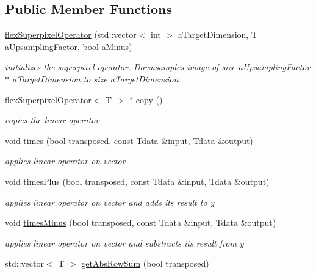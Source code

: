 \subsection*{Public Member Functions}
\begin{DoxyCompactItemize}
\item 
\hyperlink{classflex_superpixel_operator_a810ff259aed4c17eed5b6c731bb59b3b}{flex\+Superpixel\+Operator} (std\+::vector$<$ int $>$ a\+Target\+Dimension, T a\+Upsampling\+Factor, bool a\+Minus)
\begin{DoxyCompactList}\small\item\em initializes the superpixel operator. Downsamples image of size a\+Upsampling\+Factor $\ast$ a\+Target\+Dimension to size a\+Target\+Dimension \end{DoxyCompactList}\item 
\hyperlink{classflex_superpixel_operator}{flex\+Superpixel\+Operator}$<$ T $>$ $\ast$ \hyperlink{classflex_superpixel_operator_ab0e066735127a3b39958c6719fe03156}{copy} ()
\begin{DoxyCompactList}\small\item\em copies the linear operator \end{DoxyCompactList}\item 
void \hyperlink{classflex_superpixel_operator_afa075c0858c693342646250225f7c425}{times} (bool transposed, const Tdata \&input, Tdata \&output)
\begin{DoxyCompactList}\small\item\em applies linear operator on vector \end{DoxyCompactList}\item 
void \hyperlink{classflex_superpixel_operator_aa9c40f1e42786b6fe9cd698cf15028fc}{times\+Plus} (bool transposed, const Tdata \&input, Tdata \&output)
\begin{DoxyCompactList}\small\item\em applies linear operator on vector and adds its result to y \end{DoxyCompactList}\item 
void \hyperlink{classflex_superpixel_operator_af0831ae77a7e8c894a110146a316c944}{times\+Minus} (bool transposed, const Tdata \&input, Tdata \&output)
\begin{DoxyCompactList}\small\item\em applies linear operator on vector and substracts its result from y \end{DoxyCompactList}\item 
std\+::vector$<$ T $>$ \hyperlink{classflex_superpixel_operator_afd3f55401eaa6fb3e8a62c7f83443a4d}{get\+Abs\+Row\+Sum} (bool transposed)

\end{DoxyCompactItemize}
